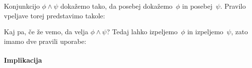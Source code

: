 Konjunkcijo $\phi \land \psi$ dokažemo tako, da posebej dokažemo~$\phi$ in posebej~$\psi$.
Pravilo vpeljave torej predstavimo takole:
%
\begin{boxDisplay}
  \begin{boxedProof}
    \begin{boxFrame}
      \begin{boxNested}
      \end{boxNested}
      \begin{boxNested}
      \end{boxNested}
    \end{boxFrame}
  \end{boxedProof}
\end{boxDisplay}
% 
Kaj pa, če že vemo, da velja $\phi \land \psi$? Tedaj lahko izpeljemo~$\phi$ in izpeljemo~$\psi$, zato imamo dve pravili uporabe:
%
\begin{boxDisplay}
\begin{boxedProof}[reserved]
\begin{boxFrame}
  \boxGap
\end{boxFrame}
\end{boxedProof}%
\boxProofSep
\begin{boxedProof}[reserved]
\begin{boxFrame}
  \boxGap
\end{boxFrame}
\end{boxedProof}
\end{boxDisplay}

\paragraph*{Implikacija}
\label{sec:implikacija-pravila}

